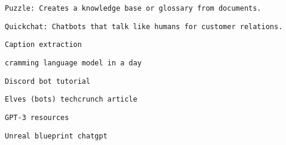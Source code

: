 \begin{verbatim}
Puzzle: Creates a knowledge base or glossary from documents.
\end{verbatim}
           

           
           
            \protect\hypertarget{ID_1120438326}{}{}

\begin{verbatim}
Quickchat: Chatbots that talk like humans for customer relations.
\end{verbatim}
           
         

         
         
          \protect\hypertarget{ID_1792204178}{}{}

\begin{verbatim}
Caption extraction
\end{verbatim}
         

         
         
          \protect\hypertarget{ID_1400562245}{}{}

\begin{verbatim}
cramming language model in a day
\end{verbatim}
         

         
         
          \protect\hypertarget{ID_690099520}{}{}

\begin{verbatim}
Discord bot tutorial
\end{verbatim}
         

         
         
          \protect\hypertarget{ID_1994214209}{}{}

\begin{verbatim}
Elves (bots) techcrunch article
\end{verbatim}
         

         
         
          \protect\hypertarget{ID_240502139}{}{}

\begin{verbatim}
GPT-3 resources
\end{verbatim}

           
           
            \protect\hypertarget{ID_330994834}{}{}

\begin{verbatim}
Unreal blueprint chatgpt
\end{verbatim}
           

